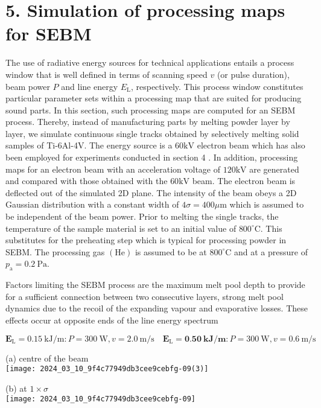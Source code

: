 \documentclass[10pt]{article}
\begin{document}
\section*{5. Simulation of processing maps for SEBM}
The use of radiative energy sources for technical applications entails a process window that is well defined in terms of scanning speed $v$ (or pulse duration), beam power $P$ and line energy $E_{\mathrm{L}}$, respectively. This process window constitutes particular parameter sets within a processing map that are suited for producing sound parts. In this section, such processing maps are computed for an SEBM process. Thereby, instead of manufacturing parts by melting powder layer by layer, we simulate continuous single tracks obtained by selectively melting solid samples of Ti-6Al-4V. The energy source is a $60 \mathrm{kV}$ electron beam which has also been employed for experiments conducted in section 4 . In addition, processing maps for an electron beam with an acceleration voltage of $120 \mathrm{kV}$ are generated and compared with those obtained with the $60 \mathrm{kV}$ beam. The electron beam is deflected out of the simulated 2D plane. The intensity of the beam obeys a 2D Gaussian distribution with a constant width of $4 \sigma=400 \mu \mathrm{m}$ which is assumed to be independent of the beam power. Prior to melting the single tracks, the temperature of the sample material is set to an initial value of $800^{\circ} \mathrm{C}$. This substitutes for the preheating step which is typical for processing powder in SEBM. The processing gas $(\mathrm{He})$ is assumed to be at $800^{\circ} \mathrm{C}$ and at a pressure of $p_{\mathrm{a}}=0.2 \mathrm{~Pa}$.

Factors limiting the SEBM process are the maximum melt pool depth to provide for a sufficient connection between two consecutive layers, strong melt pool dynamics due to the recoil of the expanding vapour and evaporative losses. These effects occur at opposite ends of the line energy spectrum

$$
\boldsymbol{E}_{\mathrm{L}}=0.15 \mathrm{~kJ} / \mathrm{m}: P=300 \mathrm{~W}, v=2.0 \mathrm{~m} / \mathrm{s} \quad \boldsymbol{E}_{\mathrm{L}}=\mathbf{0 . 5 0} \mathbf{~ k J} / \mathbf{m}: P=300 \mathrm{~W}, v=0.6 \mathrm{~m} / \mathrm{s}
$$

(a) centre of the beam\\
\texttt{[image: 2024\_03\_10\_9f4c77949db3cee9cebfg-09(3)]}

(b) at $1 \times \sigma$\\
\texttt{[image: 2024\_03\_10\_9f4c77949db3cee9cebfg-09]}
\end{document}
